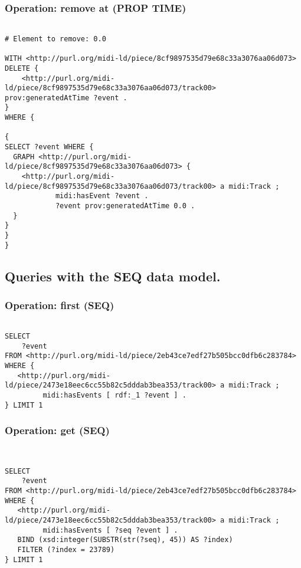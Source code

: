 \subsubsection{Operation: remove at (PROP TIME)}
\label{query:PROP\-TIME:remove_at}

\begin{lstlisting}[language=sparql]

# Element to remove: 0.0

WITH <http://purl.org/midi-ld/piece/8cf9897535d79e68c33a3076aa06d073>
DELETE {
	<http://purl.org/midi-ld/piece/8cf9897535d79e68c33a3076aa06d073/track00> prov:generatedAtTime ?event .
}
WHERE {

{
SELECT ?event WHERE {
  GRAPH <http://purl.org/midi-ld/piece/8cf9897535d79e68c33a3076aa06d073> {
    <http://purl.org/midi-ld/piece/8cf9897535d79e68c33a3076aa06d073/track00> a midi:Track ;
			midi:hasEvent ?event .
			?event prov:generatedAtTime 0.0 .
  }
}
}
}

\end{lstlisting}


\subsection{Queries with the SEQ data model.}
\label{queries:SEQ}

\subsubsection{Operation: first (SEQ)}
\label{query:SEQ:first}

\begin{lstlisting}[language=sparql]

SELECT
	?event
FROM <http://purl.org/midi-ld/piece/2eb43ce7edf27b505bcc0dfb6c283784>
WHERE {
   <http://purl.org/midi-ld/piece/2473e18eec6cc55b82c5dddab3bea353/track00> a midi:Track ;
         midi:hasEvents [ rdf:_1 ?event ] .
} LIMIT 1

\end{lstlisting}

\subsubsection{Operation: get (SEQ)}
\label{query:SEQ:get}

\begin{lstlisting}[language=sparql]


SELECT
	?event
FROM <http://purl.org/midi-ld/piece/2eb43ce7edf27b505bcc0dfb6c283784>
WHERE {
   <http://purl.org/midi-ld/piece/2473e18eec6cc55b82c5dddab3bea353/track00> a midi:Track ;
         midi:hasEvents [ ?seq ?event ] .
   BIND (xsd:integer(SUBSTR(str(?seq), 45)) AS ?index)
   FILTER (?index = 23789)
} LIMIT 1

\end{lstlisting}

